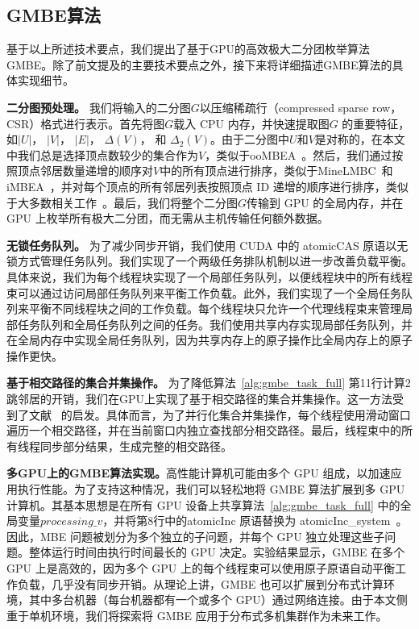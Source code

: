 

\subsection{GMBE算法}

基于以上所述技术要点，我们提出了基于GPU的高效极大二分团枚举算法GMBE。除了前文提及的主要技术要点之外，接下来将详细描述GMBE算法的具体实现细节。

\textbf{二分图预处理。} 我们将输入的二分图$G$以压缩稀疏行（compressed sparse row，CSR）格式进行表示。首先将图$G$载入 CPU 内存，并快速提取图$G$ 的重要特征，如$|U|$， $|V|$， $|E|$， 
$\Delta(V)$， 和 $\Delta_2(V)$。由于二分图中$U$和$V$是对称的，在本文中我们总是选择顶点数较少的集合作为$V$，类似于ooMBEA~\cite{ooMBE22}。然后，我们通过按照顶点邻居数量递增的顺序对$V$中的所有顶点进行排序，类似于MineLMBC~\cite{minel06}和iMBEA~\cite{iMBEA14}，并对每个顶点的所有邻居列表按照顶点 ID 递增的顺序进行排序，类似于大多数相关工作~\cite{g2miner22,Kclique22}。最后，我们将整个二分图$G$传输到 GPU 的全局内存，并在 GPU 上枚举所有极大二分团，而无需从主机传输任何额外数据。

\textbf{无锁任务队列。} 为了减少同步开销，我们使用 CUDA 中的 \textsf{atomicCAS} 原语以无锁方式管理任务队列。我们实现了一个两级任务排队机制以进一步改善负载平衡。具体来说，我们为每个线程块实现了一个局部任务队列，以便线程块中的所有线程束可以通过访问局部任务队列来平衡工作负载。此外，我们实现了一个全局任务队列来平衡不同线程块之间的工作负载。每个线程块只允许一个代理线程束来管理局部任务队列和全局任务队列之间的任务。我们使用共享内存实现局部任务队列，并在全局内存中实现全局任务队列，因为共享内存上的原子操作比全局内存上的原子操作更快。

\textbf{基于相交路径的集合并集操作。} 为了降低算法~\ref{alg:gmbe_task_full} 第11行计算2跳邻居的开销，我们在GPU上实现了基于相交路径的集合并集操作。这一方法受到了文献~\cite{GpuMergePathIntersect14} 的启发。具体而言，为了并行化集合并集操作，每个线程使用滑动窗口遍历一个相交路径，并在当前窗口内独立查找部分相交路径。最后，线程束中的所有线程同步部分结果，生成完整的相交路径。

\textbf{多GPU上的GMBE算法实现。}高性能计算机可能由多个 GPU 组成，以加速应用执行性能。为了支持这种情况，我们可以轻松地将 GMBE 算法扩展到多 GPU 计算机。其基本思想是在所有 GPU 设备上共享算法~\ref{alg:gmbe_task_full} 中的全局变量$processing\_v$，并将第8行中的\textsf{atomicInc} 原语替换为 \textsf{atomicInc\_system}~\cite{CUDAProgrammingGuide}。因此，MBE 问题被划分为多个独立的子问题，并每个 GPU 独立处理这些子问题。整体运行时间由执行时间最长的 GPU 决定。实验结果显示，GMBE 在多个 GPU 上是高效的，因为多个 GPU 上的每个线程束可以使用原子原语自动平衡工作负载，几乎没有同步开销。从理论上讲，GMBE 也可以扩展到分布式计算环境，其中多台机器（每台机器都有一个或多个 GPU）通过网络连接。由于本文侧重于单机环境，我们将探索将 GMBE 应用于分布式多机集群作为未来工作。


